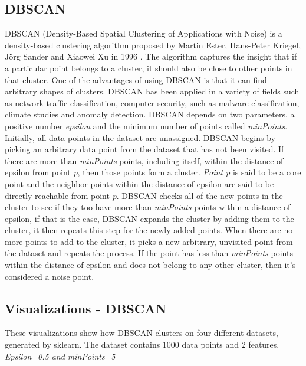 \documentclass[a4paper]{article}
\begin{document}
\subsection{DBSCAN}

DBSCAN (Density-Based Spatial Clustering of Applications with Noise) is a density-based clustering algorithm proposed by Martin Ester, Hans-Peter Kriegel, Jörg Sander and Xiaowei Xu in 1996 \cite{Ester96adensity-based}. The algorithm captures the insight that if a particular point belongs to a cluster, it should also be close to other points in that cluster. One of the advantages of using DBSCAN is that it can find arbitrary shapes of clusters. DBSCAN has been applied in a variety of fields such as network traffic classification\cite{erman2006traffic}, computer security, such as malware classification\cite{Kinable2011MalwareCB}, climate studies\cite{erman2006traffic} and anomaly detection\cite{airplane}. DBSCAN depends on two parameters, a positive number \textit{epsilon} and the minimum number of points called \textit{minPoints}. 
Initially, all data points in the dataset are unassigned. DBSCAN 
begins by picking an arbitrary data point from the dataset that has not been visited. If there are more than \textit{minPoints} points, including itself, within the distance of {epsilon} from point \textit{p}, then those points form a cluster. \textit{Point p} is said to be a core point and the neighbor points within the distance of {epsilon} are said to be directly reachable from point \textit{p}. DBSCAN checks all of the new points in the cluster to see if they too have more than \textit{minPoints} points within a distance of {epsilon}, if that is the case, DBSCAN expands the cluster by adding them to the cluster, it then repeats this step for the newly added points. When there are no more points to add to the cluster, it picks a new arbitrary, unvisited point from the dataset and repeats the process. If the point has less than \textit{minPoints} points within the distance of {epsilon} and does not belong to any other cluster, then it's considered a noise point.

\subsection{Visualizations - DBSCAN}

These visualizations show how DBSCAN clusters on four different datasets, generated by sklearn. The dataset contains 1000 data points and 2 features. \textit{Epsilon=0.5 and minPoints=5}
\end{document}
